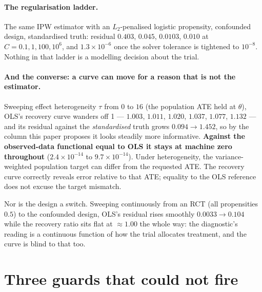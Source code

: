 \paragraph{The regularisation ladder.} The same IPW estimator with an
$L_2$-penalised logistic propensity, confounded design, standardised truth:
residual $0.403$, $0.045$, $0.0103$, $0.010$ at $C = 0.1, 1, 100, 10^6$, and
$1.3\times10^{-6}$ once the solver tolerance is tightened to $10^{-8}$. Nothing
in that ladder is a modelling decision about the trial.


\paragraph{And the converse: a curve can move for a reason that is not the
estimator.} Sweeping effect heterogeneity $\tau$ from $0$ to $16$ (the
population ATE held at $\theta$), OLS's recovery curve wanders off 1 ---
$1.003$, $1.011$, $1.020$, $1.037$, $1.077$, $1.132$ --- and its residual
against the \emph{standardised} truth grows $0.094 \rightarrow 1.452$, so by the
column this paper proposes it looks steadily more informative.
\textbf{Against the observed-data functional equal to OLS it stays at machine zero
throughout} ($2.4\times10^{-14}$ to $9.7\times10^{-14}$). Under heterogeneity, the variance-weighted population target can differ
from the requested ATE. The recovery curve correctly reveals error relative to
that ATE; equality to the OLS reference does not excuse the target mismatch.

Nor is the design a switch. Sweeping continuously from an RCT (all propensities
$0.5$) to the confounded design, OLS's residual rises smoothly $0.0033
\rightarrow 0.104$ while the recovery ratio sits flat at $\approx 1.00$ the
whole way: the diagnostic's reading is a continuous function of how the trial
allocates treatment, and the curve is blind to that too.

\section{Three guards that could not fire}
\label{app:guards}


